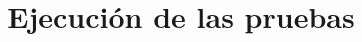\documentclass[12pt,letterpaper]{report}
\begin{document}
\renewcommand{\listtablename}{Índice de tablas}
\renewcommand{\tablename}{Tabla}
    \title{\textbf{Ejecución de las pruebas}}
    \author{\textbf{}}


\beforepreface



\newpage
\afterpreface



 




%
%
%
\end{document}
